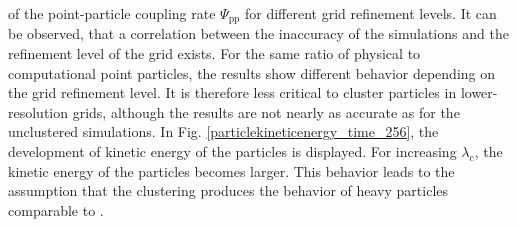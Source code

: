 \documentclass[11pt,a4paper,openany,oneside,parskip=half*]{article}
\begin{document}
of the point-particle coupling rate $\Psi_\mathrm{pp}$ for different grid refinement levels. 
It can be observed, that a correlation between the inaccuracy of the simulations and the refinement level of the grid exists. For the same ratio of physical to computational point particles, the results show different behavior depending on the grid refinement level. It is therefore less critical to cluster particles in lower-resolution grids, although the results are not nearly as accurate as for the unclustered simulations. 
\newline %
In Fig. \ref{particlekineticenergy_time_256}, the development of kinetic energy of the particles is displayed. For increasing $\lambda_\mathrm{c}$, the kinetic energy of the particles becomes larger. This behavior leads to the assumption that the clustering produces the behavior of heavy particles comparable to \cite{Schneiders2017}. 
\pagebreak
\end{document}
